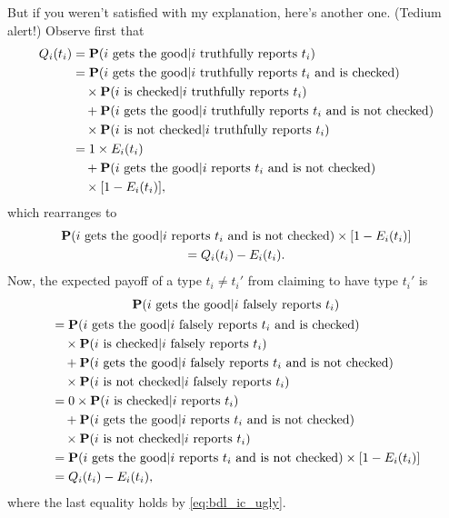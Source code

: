 But if you weren't satisfied with my explanation, here's another one. (Tedium alert!)
Observe first that
%
\begin{align*}
	Q_i(t_i)
	&= \mathbf{P}( \text{$i$ gets the good}
	| \text{$i$ truthfully reports $t_i$} )
	\\
	&= \mathbf{P}( \text{$i$ gets the good}
	| \text{$i$ truthfully reports $t_i$ and is checked} )
	\\
	&\quad \times \mathbf{P}( \text{$i$ is checked} 
	| \text{$i$ truthfully reports $t_i$} )
	\\
	&\quad + \mathbf{P}( \text{$i$ gets the good}
	| \text{$i$ truthfully reports $t_i$ and is not checked} )
	\\
	&\quad \times \mathbf{P}( \text{$i$ is not checked} 
	| \text{$i$ truthfully reports $t_i$} )
	\\
	&= 1 \times E_i(t_i)
	\\
	&\quad + \mathbf{P}( \text{$i$ gets the good}
	| \text{$i$ reports $t_i$ and is not checked} )
	\\
	&\quad \times [ 1 - E_i(t_i) ] ,
\end{align*}
%
which rearranges to
%
\begin{multline}
	\mathbf{P}( \text{$i$ gets the good}
	| \text{$i$ reports $t_i$ and is not checked} )
	\times [ 1 - E_i(t_i) ]
	\\
	= Q_i(t_i) - E_i(t_i) .
	\label{eq:bdl_ic_ugly}
\end{multline}
%
Now, the expected payoff of a type $t_i \neq t_i'$ from claiming to have type $t_i'$ is
%
\begin{multline*}
	\mathbf{P}( \text{$i$ gets the good}
	| \text{$i$ falsely reports $t_i$} )
	\\
	\begin{aligned}
		&= \mathbf{P}( \text{$i$ gets the good}
		| \text{$i$ falsely reports $t_i$ and is checked} )
		\\
		&\quad \times \mathbf{P}( \text{$i$ is checked}
		| \text{$i$ falsely reports $t_i$} )
		\\
		&\quad + \mathbf{P}( \text{$i$ gets the good}
		| \text{$i$ falsely reports $t_i$ and is not checked} )
		\\
		&\quad \times \mathbf{P}( \text{$i$ is not checked}
		| \text{$i$ falsely reports $t_i$} )
		\\
		&= 0 \times \mathbf{P}( \text{$i$ is checked}
		| \text{$i$ reports $t_i$} )
		\\
		&\quad + \mathbf{P}( \text{$i$ gets the good}
		| \text{$i$ reports $t_i$ and is not checked} )
		\\
		&\quad \times \mathbf{P}( \text{$i$ is not checked}
		| \text{$i$ reports $t_i$} )
		\\
		&= \mathbf{P}( \text{$i$ gets the good}
		| \text{$i$ reports $t_i$ and is not checked} )
		\times [ 1 - E_i(t_i) ]
		\\
		&= Q_i(t_i) - E_i(t_i) ,
	\end{aligned}
\end{multline*}
%
where the last equality holds by \eqref{eq:bdl_ic_ugly}.



